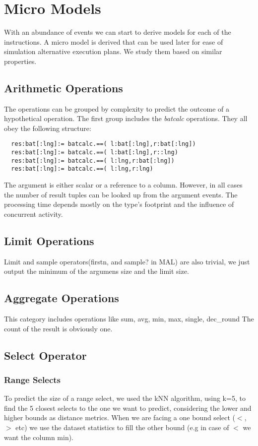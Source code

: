 \section{Micro Models}
With an abundance of events we can start to derive models for each of the instructions.
A micro model is derived that can be used later for ease of simulation
alternative execution plans. We study them based on similar properties.

\subsection{Arithmetic Operations}
The operations can be grouped by complexity to predict the outcome of a hypothetical operation.
The first group includes the {\em batcalc} operations.
They all obey the following structure:
\begin{verbatim}
  res:bat[:lng]:= batcalc.==( l:bat[:lng],r:bat[:lng])
  res:bat[:lng]:= batcalc.==( l:bat[:lng],r::lng)
  res:bat[:lng]:= batcalc.==( l:lng,r:bat[:lng])
  res:bat[:lng]:= batcalc.==( l:lng,r:lng)

\end{verbatim}
The argument is either scalar or a reference to a column.
However, in all cases the number of result tuples can be looked up from the argument events.
The processing time depends mostly on the type's footprint and the influence of concurrent activity.


\subsection{Limit Operations}
Limit and sample operators(firstn, and sample? in MAL) are also trivial,
we just output the minimum of the argumens size and the limit size.


\subsection{Aggregate Operations}
This category includes operations like sum, avg, min, max, single, dec\_round
The count of the result is obviously one.

\subsection{Select Operator}
\subsubsection{Range Selects}
To predict the size of a range select, we used the kNN algorithm,
using k=5, to find the 5 closest selects to the one we want to predict,
considering the lower and higher bounds as distance metrics.
When we are facing a one bound select ($<$,$>$ etc) we use the
dataset statistics to fill the other bound (e.g in case of $<$ we want the column min).
